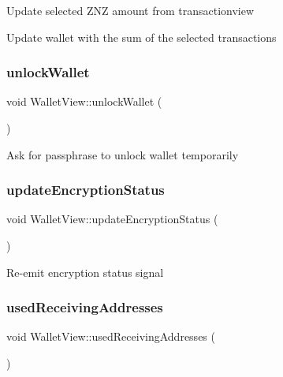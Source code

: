 Update selected Z\+NZ amount from transactionview

Update wallet with the sum of the selected transactions \mbox{\label{class_wallet_view_ac258d549f0e55ad4f84b9d21848faf02}} 
\subsubsection{\texorpdfstring{unlockWallet}{unlockWallet}}
{\footnotesize\ttfamily void Wallet\+View\+::unlock\+Wallet (\begin{DoxyParamCaption}{ }\end{DoxyParamCaption})\hspace{0.3cm}{\ttfamily [slot]}}

Ask for passphrase to unlock wallet temporarily \mbox{\label{class_wallet_view_ad348f2ed9f843ef9125ca416307c7412}} 
\subsubsection{\texorpdfstring{updateEncryptionStatus}{updateEncryptionStatus}}
{\footnotesize\ttfamily void Wallet\+View\+::update\+Encryption\+Status (\begin{DoxyParamCaption}{ }\end{DoxyParamCaption})\hspace{0.3cm}{\ttfamily [slot]}}

Re-\/emit encryption status signal \mbox{\label{class_wallet_view_accb5d9e2789c62e03ad1723518d31c02}} 
\subsubsection{\texorpdfstring{usedReceivingAddresses}{usedReceivingAddresses}}
{\footnotesize\ttfamily void Wallet\+View\+::used\+Receiving\+Addresses (\begin{DoxyParamCaption}{ }\end{DoxyParamCaption})\hspace{0.3cm}{\ttfamily [slot]}}

